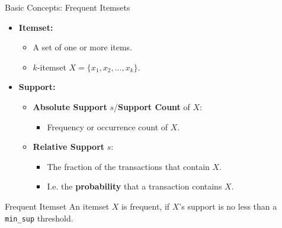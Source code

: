 \begin{frame}{Basic Concepts: Frequent Itemsets}
	\begin{itemize}
		\item \textbf{Itemset:}
		      \begin{itemize}
			      \item A set of one or more items.
			      \item $k$-itemset $X = \{x_1, x_2, \ldots, x_k\}$.
		      \end{itemize}
		\item \textbf{Support:}
		      \begin{itemize}
			      \item \textbf{Absolute Support} $s$/\textbf{Support Count} of $X$:
			            \begin{itemize}
				            \item Frequency or occurrence count of $X$.
			            \end{itemize}
			      \item \textbf{Relative Support} $s$:
			            \begin{itemize}
				            \item The fraction of the transactions that contain $X$.
				            \item I.e. the \textbf{probability} that a transaction
				                  contains $X$.
			            \end{itemize}
		      \end{itemize}
	\end{itemize}

	\vspace*{0.75cm}

	\begin{block}{Frequent Itemset}
		An itemset $X$ is frequent, if $X$'s support is no less than a \texttt{min\_sup} threshold.
	\end{block}
\end{frame}

